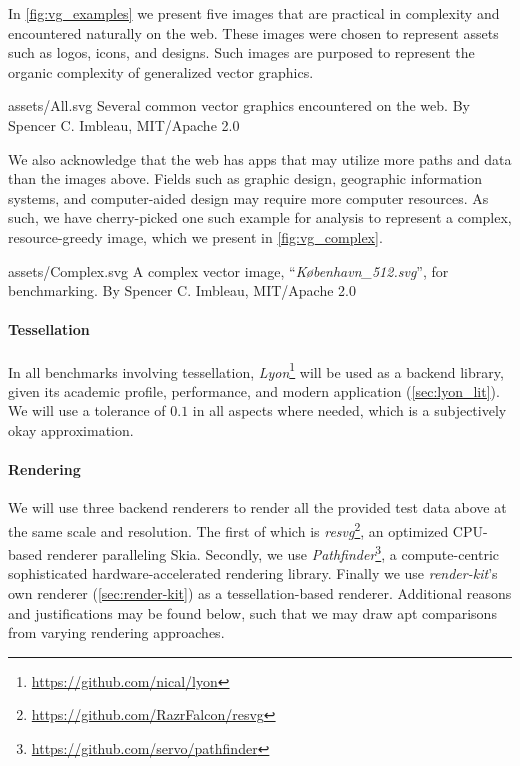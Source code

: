 In \cref{fig:vg_examples} we present five images that are practical in complexity and encountered naturally on the web. These images were chosen to represent assets such as logos, icons, and designs. Such images are purposed to represent the organic complexity of generalized vector graphics.\medskip
 
\widesvg
{assets/All.svg}
{Several common vector graphics encountered on the web.\label{fig:vg_examples}}
{By Spencer C. Imbleau, MIT/Apache 2.0}\medskip

We also acknowledge that the web has apps that may utilize more paths and data than the images above. Fields such as graphic design, geographic information systems, and computer-aided design may require more computer resources. As such, we have cherry-picked one such example for analysis to represent a complex, resource-greedy image, which we present in \cref{fig:vg_complex}.\medskip

\svg
{assets/Complex.svg}
{A complex vector image, ``\textit{København\_512.svg}'', for benchmarking.\label{fig:vg_complex}}
{By Spencer C. Imbleau, MIT/Apache 2.0}

\paragraph{Tessellation}\label{sec:instrumentation_tessellator} In all benchmarks involving tessellation, \textit{Lyon}\footnote{\href{https://github.com/nical/lyon}{https://github.com/nical/lyon}} will be used as a backend library, given its academic profile\cite{Silva18}, performance\cite{Lyon_Sweep}, and modern application (\cref{sec:lyon_lit}). We will use a tolerance of \(0.1\) in all aspects where needed, which is a subjectively okay approximation.\medskip

\paragraph{Rendering}\label{sec:instrumentation_renderers} We will use three backend renderers to render all the provided test data above at the same scale and resolution. The first of which is \textit{resvg}\footnote{\href{https://github.com/RazrFalcon/resvg}{https://github.com/RazrFalcon/resvg}}, an optimized CPU-based renderer paralleling Skia. Secondly, we use \textit{Pathfinder}\footnote{\href{https://github.com/servo/pathfinder}{https://github.com/servo/pathfinder}}, a compute-centric sophisticated hardware-accelerated rendering library. Finally we use \textit{render-kit}'s own renderer (\cref{sec:render-kit}) as a tessellation-based renderer. Additional reasons and justifications may be found below, such that we may draw apt comparisons from varying rendering approaches.

